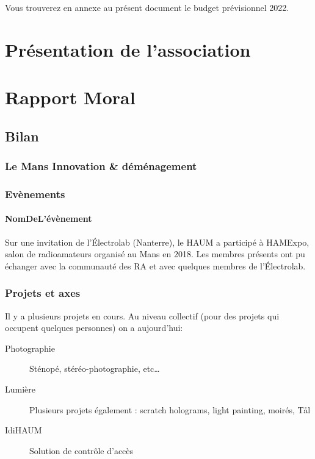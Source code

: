 \documentclass[11pt]{article}
\begin{document}
Vous trouverez en annexe au présent document le budget prévisionnel 2022.

\section{Présentation de l'association}

\section{Rapport Moral}

\subsection{Bilan}

\subsubsection{Le Mans Innovation \& déménagement}

\subsubsection{Evènements}

\paragraph{NomDeL'évènement} Sur une invitation de l'Électrolab (Nanterre), le HAUM a participé à
HAMExpo, salon de radioamateurs organisé au Mans en 2018. Les membres présents ont pu
échanger avec la communauté des RA et avec quelques membres de l'Électrolab.

\subsubsection{Projets et axes}

Il y a plusieurs projets en cours. Au niveau collectif (pour des projets qui occupent
quelques personnes) on a aujourd'hui:

\begin{description}
	\item[Photographie] Sténopé, stéréo-photographie, etc\ldots
	\item[Lumière] Plusieurs projets également : scratch holograms, light painting,  moirés, Tål
	\item[IdiHAUM\footnotemark] Solution de contrôle d'accès
\end{description}
\end{document}
